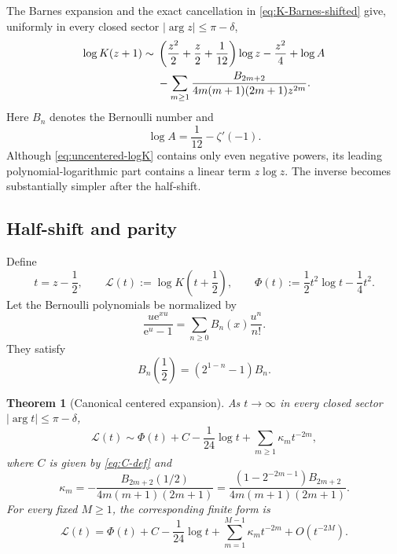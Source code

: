 \documentclass[11pt,oneside]{article}
\theoremstyle{plain}
\newtheorem{theorem}{Theorem}[section]
\theoremstyle{definition}
\theoremstyle{remark}
\newcommand{\e}{\mathrm{e}}
\newcommand{\Lcal}{\mathcal{L}}
\begin{document}
The Barnes expansion
\cite[\S5.17(ii)]{DLMF} and the exact cancellation in
\cref{eq:K-Barnes-shifted} give, uniformly in every closed sector
\(|\arg z|\le\pi-\delta\),
\begin{align}
 \log K(z+1)
 \sim{}&\left(\frac{z^2}{2}+\frac z2+\frac1{12}\right)\log z
       -\frac{z^2}{4}+\log A
 \notag\\
 &-\sum_{m\ge1}
 \frac{B_{2m+2}}{4m(m+1)(2m+1)z^{2m}}.
 \label{eq:uncentered-logK}
\end{align}
Here \(B_n\) denotes the Bernoulli number and
\begin{equation}
 \log A=\frac1{12}-\zeta'(-1).
 \label{eq:logA}
\end{equation}
Although \cref{eq:uncentered-logK} contains only even negative powers, its
leading polynomial-logarithmic part contains a linear term \(z\log z\).  The
inverse becomes substantially simpler after the half-shift.

\subsection{Half-shift and parity}

Define
\begin{equation}
 t=z-\frac12,
 \qquad
 \Lcal(t):=\log K\!\left(t+\frac12\right),
 \qquad
 \Phi(t):=\frac12t^2\log t-\frac14t^2.
 \label{eq:centered-defs}
\end{equation}
Let the Bernoulli polynomials be normalized by
\begin{equation}
 \frac{u\e^{xu}}{\e^u-1}
 =\sum_{n\ge0}B_n(x)\frac{u^n}{n!}.
 \label{eq:Bernoulli-polys}
\end{equation}
They satisfy
\begin{equation}
 B_n\!\left(\frac12\right)=(2^{1-n}-1)B_n.
 \label{eq:Bernoulli-half}
\end{equation}

\begin{theorem}[Canonical centered expansion]
\label{thm:centered-expansion}
As \(t\to\infty\) in every closed sector
\(|\arg t|\le\pi-\delta\),
\begin{equation}
 \Lcal(t)
 \sim \Phi(t)+C-\frac1{24}\log t
       +\sum_{m\ge1}\kappa_m t^{-2m},
 \label{eq:centered-logK}
\end{equation}
where \(C\) is given by \cref{eq:C-def} and
\begin{equation}
 \kappa_m
 =-\frac{B_{2m+2}(1/2)}{4m(m+1)(2m+1)}
 =\frac{(1-2^{-2m-1})B_{2m+2}}
        {4m(m+1)(2m+1)}.
 \label{eq:kappa-formula}
\end{equation}
For every fixed \(M\ge1\), the corresponding finite form is
\begin{equation}
 \Lcal(t)=\Phi(t)+C-\frac1{24}\log t
 +\sum_{m=1}^{M-1}\kappa_m t^{-2m}+O(t^{-2M}).
 \label{eq:centered-remainder}
\end{equation}
\end{theorem}
\end{document}
